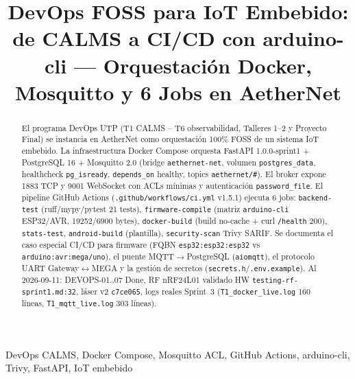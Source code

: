 \documentclass[conference]{IEEEtran}
\begin{document}
\title{DevOps FOSS para IoT Embebido: de CALMS a CI/CD con arduino-cli — Orquestación Docker, Mosquitto y 6 Jobs en AetherNet}
\author{
\and
{}
}
\maketitle

\begin{abstract}
El programa DevOps UTP (T1 CALMS -- T6 observabilidad, Talleres 1--2 y Proyecto Final) se instancia en AetherNet como orquestación 100\% FOSS de un sistema IoT embebido. La infraestructura Docker Compose orquesta FastAPI 1.0.0-sprint1 + PostgreSQL 16 + Mosquitto 2.0 (bridge \texttt{aethernet-net}, volumen \texttt{postgres\_data}, healthcheck \texttt{pg\_isready}, \texttt{depends\_on} healthy, topics \texttt{aethernet/\#}). El broker expone 1883 TCP y 9001 WebSocket con ACLs mínimas y autenticación \texttt{password\_file}. El pipeline GitHub Actions (\texttt{.github/workflows/ci.yml} v1.5.1) ejecuta 6 jobs: \texttt{backend-test} (ruff/mypy/pytest 21 tests), \texttt{firmware-compile} (matriz \texttt{arduino-cli} ESP32/AVR, 19252/6900 bytes), \texttt{docker-build} (build no-cache + curl \texttt{/health} 200), \texttt{stats-test}, \texttt{android-build} (plantilla), \texttt{security-scan} Trivy SARIF. Se documenta el caso especial CI/CD para firmware (FQBN \texttt{esp32:esp32:esp32} vs \texttt{arduino:avr:mega/uno}), el puente MQTT$\rightarrow$PostgreSQL (\texttt{aiomqtt}), el protocolo UART Gateway$\leftrightarrow$MEGA y la gestión de secretos (\texttt{secrets.h}/\texttt{.env.example}). Al 2026-09-11: DEVOPS-01..07 Done, RF nRF24L01 validado HW \texttt{testing-rf-sprint1.md:32}, láser v2 \texttt{c7ce065}, logs reales Sprint~3 (\texttt{T1\_docker\_live.log} 160 líneas, \texttt{T1\_mqtt\_live.log} 303 líneas).
\end{abstract}
\begin{IEEEkeywords}
DevOps CALMS, Docker Compose, Mosquitto ACL, GitHub Actions, arduino-cli, Trivy, FastAPI, IoT embebido
\end{IEEEkeywords}
\end{document}
